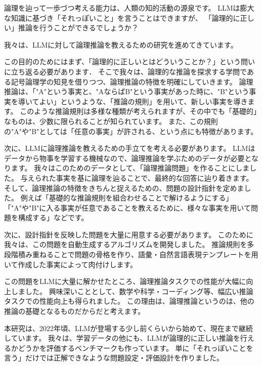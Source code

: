 \indent 論理を辿って一歩づつ考える能力は、人類の知的活動の源泉です。
LLMは膨大な知識に基づき「それっぽいこと」を言うことはできますが、
「論理的に正しい」推論を行うことができるでしょうか？


\indent 我々は、LLMに対して論理推論を教えるための研究を進めてきています。

\indent この目的のためにはまず、「論理的に正しいとはどういうことか？」という問いに立ち返る必要があります．
そこで我々は、論理的な推論を探求する学問である記号論理学の知見を借りつつ、論理推論の特徴を明確にしていきます。
論理推論は、「"A"という事実と、"AならばB"という事実があった時に、"B"という事実を導いてよい」というような、「推論の規則」を用いて、新しい事実を導きます。
このような推論規則は多様な種類が考えられますが、その中でも「基礎的」なものは、少数に限られることが知られています。
また、この規則の"A"や"B"としては「任意の事実」が許される、という点にも特徴があります。

\indent 次に、LLMに論理推論を教えるための手立てを考える必要があります。
LLMはデータから物事を学習する機械なので、論理推論を学ぶためのデータが必要となります。
我々はこのためのデータとして、「論理推論問題」を作ることにしました。
与えられた事実を基に論理を辿ることで、最終的な回答に辿り着きます。
そして、論理推論の特徴をきちんと捉えるための、問題の設計指針を定めました。
例えば「基礎的な推論規則を組合わせることで解けるようにする」「"A"や"B"に入る事実が任意であることを教えるために、様々な事実を用いて問題を構成する」などです。

\indent 次に、設計指針を反映した問題を大量に用意する必要があります。
このために我々は、この問題を自動生成するアルゴリズムを開発しました。
推論規則を多段階積み重ねることで問題の骨格を作り、語彙・自然言語表現テンプレートを用いて作成した事実によって肉付けします。

\indent この問題をLLMに大量に解かせたところ、論理推論タスクでの性能が大幅に向上しました。
興味深いこととして、数学や科学・コーディング等、幅広い推論タスクでの性能向上も得られました。
この理由は、論理推論というのは、他の推論の基礎となるものだからだと考えます。

\indent 本研究は、2022年頃、LLMが登場する少し前くらいから始めて、現在まで継続しています。
我々は、学習データの他にも、LLMが論理的に正しい推論を行えるかどうかを評価するベンチマークも作っています。
単に「それっぽいことを言う」だけでは正解できなような問題設定・評価設計を作りました。
